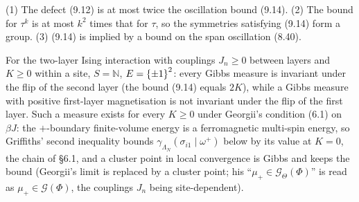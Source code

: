 \begin{remark}[Georgii (9.13)]
    \label{rmk:sb-9-13}
    \leanok

    (1) The defect (9.12) is at most twice the oscillation bound (9.14). (2) The bound for
    $\tau^k$ is at most $k^2$ times that for $\tau$, so the symmetries satisfying (9.14) form a
    group. (3) (9.14) is implied by a bound on the span oscillation (8.40).
\end{remark}

\begin{example}[Georgii (9.15)]
    \label{ex:sb-9-15}
    \leanok

    For the two-layer Ising interaction with couplings $J_n \geq 0$ between layers and $K \geq 0$
    within a site, $S = \mathbb N$, $E = \left\{ \pm1 \right\}^2$: every Gibbs measure is invariant under the
    flip of the second layer (the bound (9.14) equals $2K$), while a Gibbs measure with positive
    first-layer magnetisation is not invariant under the flip of the first layer. Such a measure
    exists for every $K \geq 0$ under Georgii's condition (6.1) on $\beta J$: the $+$-boundary
    finite-volume energy is a ferromagnetic multi-spin energy, so Griffiths' second inequality
    bounds $\gamma_{\Lambda_N}(\sigma_{i1}\mid\omega^+)$ below by its value at $K = 0$, the chain
    of \S6.1, and a cluster point in local convergence is Gibbs and keeps the bound (Georgii's
    limit is replaced by a cluster point; his ``$\mu_+ \in \mathcal G_\Theta(\Phi)$'' is read as
    $\mu_+ \in \mathcal G(\Phi)$, the couplings $J_n$ being site-dependent).
\end{example}


